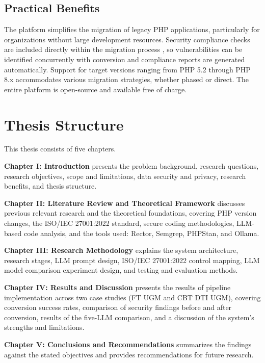 \subsection{Practical Benefits}

The platform simplifies the migration of legacy PHP applications, particularly for organizations without large development resources. Security compliance checks are included directly within the migration process \cite{iso27001_2022}, so vulnerabilities can be identified concurrently with conversion and compliance reports are generated automatically. Support for target versions ranging from PHP 5.2 through PHP 8.x accommodates various migration strategies, whether phased or direct. The entire platform is open-source and available free of charge.

\section{Thesis Structure}

This thesis consists of five chapters.

\noindent \textbf{Chapter I: Introduction} presents the problem background, research questions, research objectives, scope and limitations, data security and privacy, research benefits, and thesis structure.

\noindent \textbf{Chapter II: Literature Review and Theoretical Framework} discusses previous relevant research and the theoretical foundations, covering PHP version changes, the ISO/IEC 27001:2022 standard, secure coding methodologies, LLM-based code analysis, and the tools used: Rector, Semgrep, PHPStan, and Ollama.

\noindent \textbf{Chapter III: Research Methodology} explains the system architecture, research stages, LLM prompt design, ISO/IEC 27001:2022 control mapping, LLM model comparison experiment design, and testing and evaluation methods.

\noindent \textbf{Chapter IV: Results and Discussion} presents the results of pipeline implementation across two case studies (FT UGM and CBT DTI UGM), covering conversion success rates, comparison of security findings before and after conversion, results of the five-LLM comparison, and a discussion of the system's strengths and limitations.

\noindent \textbf{Chapter V: Conclusions and Recommendations} summarizes the findings against the stated objectives and provides recommendations for future research.